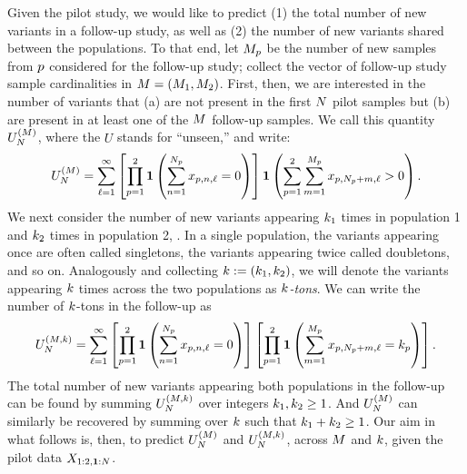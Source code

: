 Given the pilot study, we would like to predict (1) the total number of new variants in a follow-up study, as well as (2) the number of new variants shared between the populations.
To that end, let $M_{p}$ be the number of new samples from $p$ considered for the follow-up study; collect
the vector of follow-up study sample cardinalities in $\vecfuturesamplesize = (\futuresamplesize{1},\futuresamplesize{2})$. 
First, then, we are interested in the number of variants that (a) are not present in the first $\vecsamplesize$ pilot samples but (b) are
present in at least one of the $\vecfuturesamplesize$ follow-up samples. We call this quantity $\genericnews$, 
where the $U$ stands for ``unseen,'' and write:
\begin{equation}
	\genericnews = 
		\sum_{\variantidx=1}^{\infty} \left[ \prod_{\popidx=1}^{2} \mathbf{1}\left( \sum_{\unitidx=1}^{\genericsamplesize} \genericvariantcount = 0\right) \right] 
				\mathbf{1}\left( \sum_{\popidx=1}^{2} \sum_{\futureunitidx=1}^{\genericfuturesamplesize} 
				\variantcount{\popidx}{\genericsamplesize+\futureunitidx}{\variantidx} > 0 \right). 
	\label{eq:news}
\end{equation}
%
We next consider the number of new variants appearing $k_{1}$ times in population 1 and $k_{2}$ times in population 2, .
In a single population, the variants appearing once are often called singletons, the variants appearing twice called doubletons, and so on. Analogously and collecting $\vecoccurrence := (\occurrence{1},\occurrence{2})$, we will denote the variants appearing $\vecoccurrence$ times across the two populations as \emph{$\vecoccurrence$-tons}.
We can write the number of $\vecoccurrence$-tons in the follow-up as
\begin{equation}
	\genericfreqnews = 
		\sum_{\variantidx=1}^{\infty} \left[ \prod_{\popidx=1}^{2} \mathbf{1}\left( \sum_{\unitidx=1}^{\genericsamplesize} \genericvariantcount = 0\right) \right]
		 \left[ \prod_{\popidx=1}^{2} \mathbf{1}\left( \sum_{\futureunitidx=1}^{\genericfuturesamplesize} \genericfuturevariantcount = \occurrence{\popidx} \right) \right]. 
	\label{eq:news_freq}
\end{equation}
The total number of new variants appearing  both populations in the follow-up can be found by summing $\genericfreqnews$ over integers $k_{1},k_{2}\ge1$. And
$\genericnews$ can similarly be recovered by summing over $\vecoccurrence$ such that $k_{1} + k_{2} \ge 1$.
%
Our aim in what follows is, then, to predict $\genericnews$ and $\genericfreqnews$, across $\vecfuturesamplesize$ and $\vecoccurrence$, given the pilot data
$\pilotdata$.
